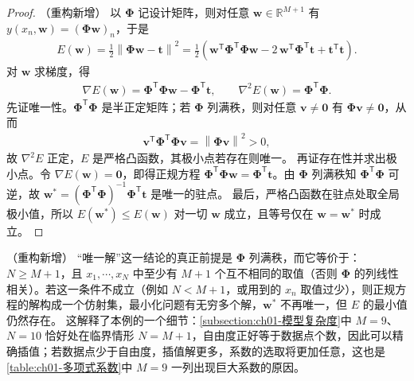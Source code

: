 \documentclass[../../main.tex]{subfiles}
\begin{document}
\begin{proof}（重构新增）
以 $\boldsymbol{\Phi}$ 记设计矩阵，则对任意 $\mathbf{w}\in\mathbb{R}^{M+1}$ 有 $y(x_n,\mathbf{w})=(\boldsymbol{\Phi}\mathbf{w})_n$，于是
\begin{align*}
  E(\mathbf{w}) = \frac{1}{2}\left\|\boldsymbol{\Phi}\mathbf{w}-\mathbf{t}\right\|^{2}
  = \frac{1}{2}\left(\mathbf{w}^{\mathsf{T}}\boldsymbol{\Phi}^{\mathsf{T}}\boldsymbol{\Phi}\mathbf{w}
  - 2\,\mathbf{w}^{\mathsf{T}}\boldsymbol{\Phi}^{\mathsf{T}}\mathbf{t}
  + \mathbf{t}^{\mathsf{T}}\mathbf{t}\right).
\end{align*}
对 $\mathbf{w}$ 求梯度，得
\begin{align*}
  \nabla E(\mathbf{w}) = \boldsymbol{\Phi}^{\mathsf{T}}\boldsymbol{\Phi}\mathbf{w} - \boldsymbol{\Phi}^{\mathsf{T}}\mathbf{t},
  \qquad
  \nabla^{2} E(\mathbf{w}) = \boldsymbol{\Phi}^{\mathsf{T}}\boldsymbol{\Phi}.
\end{align*}
先证唯一性。$\boldsymbol{\Phi}^{\mathsf{T}}\boldsymbol{\Phi}$ 是半正定矩阵；若 $\boldsymbol{\Phi}$ 列满秩，则对任意 $\mathbf{v}\neq\mathbf{0}$ 有 $\boldsymbol{\Phi}\mathbf{v}\neq\mathbf{0}$，从而
\begin{align*}
  \mathbf{v}^{\mathsf{T}}\boldsymbol{\Phi}^{\mathsf{T}}\boldsymbol{\Phi}\mathbf{v} = \left\|\boldsymbol{\Phi}\mathbf{v}\right\|^{2} > 0,
\end{align*}
故 $\nabla^{2}E$ 正定，$E$ 是严格凸函数，其极小点若存在则唯一。
再证存在性并求出极小点。令 $\nabla E(\mathbf{w})=\mathbf{0}$，即得正规方程 $\boldsymbol{\Phi}^{\mathsf{T}}\boldsymbol{\Phi}\mathbf{w}=\boldsymbol{\Phi}^{\mathsf{T}}\mathbf{t}$。由 $\boldsymbol{\Phi}$ 列满秩知 $\boldsymbol{\Phi}^{\mathsf{T}}\boldsymbol{\Phi}$ 可逆，故 $\mathbf{w}^{*}=(\boldsymbol{\Phi}^{\mathsf{T}}\boldsymbol{\Phi})^{-1}\boldsymbol{\Phi}^{\mathsf{T}}\mathbf{t}$ 是唯一的驻点。
最后，严格凸函数在驻点处取全局极小值，所以 $E(\mathbf{w}^{*})\leqslant E(\mathbf{w})$ 对一切 $\mathbf{w}$ 成立，且等号仅在 $\mathbf{w}=\mathbf{w}^{*}$ 时成立。
\end{proof}

\begin{remark}（重构新增）
“唯一解”这一结论的真正前提是 $\boldsymbol{\Phi}$ 列满秩，而它等价于：$N\geqslant M+1$，且 $x_1,\cdots,x_N$ 中至少有 $M+1$ 个互不相同的取值（否则 $\boldsymbol{\Phi}$ 的列线性相关）。若这一条件不成立（例如 $N<M+1$，或用到的 $x_n$ 取值过少），则正规方程的解构成一个仿射集，最小化问题有无穷多个解，$\mathbf{w}^{*}$ 不再唯一，但 $E$ 的最小值仍然存在。
这解释了本例的一个细节：\cref{subsection:ch01-模型复杂度}中 $M=9$、$N=10$ 恰好处在临界情形 $N=M+1$，自由度正好等于数据点个数，因此可以精确插值；若数据点少于自由度，插值解更多，系数的选取将更加任意，这也是\cref{table:ch01-多项式系数}中 $M=9$ 一列出现巨大系数的原因。
\end{remark}
\end{document}
